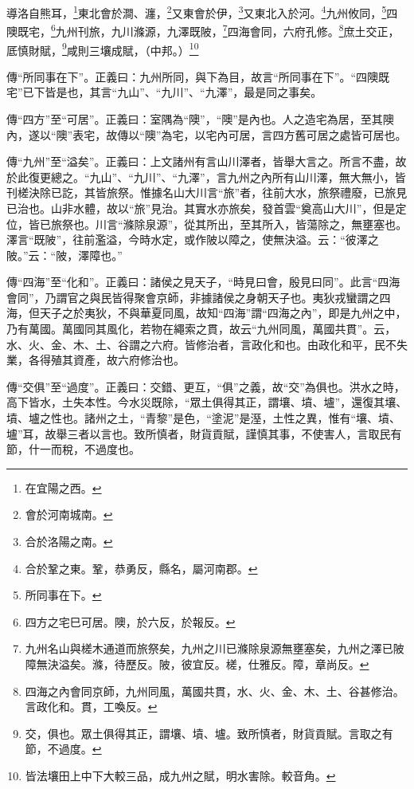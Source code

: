 導洛自熊耳，\footnote{在宜陽之西。}東北會於澗、瀍，\footnote{會於河南城南。}又東會於伊，\footnote{合於洛陽之南。}又東北入於河。\footnote{合於鞏之東。鞏，恭勇反，縣名，屬河南郡。}九州攸同，\footnote{所同事在下。}四隩既宅，\footnote{四方之宅巳可居。隩，於六反，於報反。}九州刊旅，九川滌源，九澤既陂，\footnote{九州名山與槎木通道而旅祭矣，九州之川已滌除泉源無壅塞矣，九州之澤已陂障無決溢矣。滌，待歷反。陂，彼宜反。槎，仕雅反。障，章尚反。}四海會同，六府孔修。\footnote{四海之內會同京師，九州同風，萬國共貫，水、火、金、木、土、谷甚修治。言政化和。貫，工喚反。}庶土交正，厎慎財賦，\footnote{交，俱也。眾土俱得其正，謂壤、墳、壚。致所慎者，財貨貢賦。言取之有節，不過度。}咸則三壤成賦，（中邦。）\footnote{皆法壤田上中下大較三品，成九州之賦，明水害除。較音角。}

{\noindent\zhuan{}\fzbyks 傳“所同事在下”。正義曰：九州所同，與下為目，故言“所同事在下”。“四隩既宅”已下皆是也，其言“九山”、“九川”、“九澤”，最是同之事矣。 \par}

{\noindent\zhuan{}\fzbyks 傳“四方”至“可居”。正義曰：室隅為“隩”，“隩”是內也。人之造宅為居，至其隩內，遂以“隩”表宅，故傳以“隩”為宅，以宅內可居，言四方舊可居之處皆可居也。 \par}

{\noindent\zhuan{}\fzbyks 傳“九州”至“溢矣”。正義曰：上文諸州有言山川澤者，皆舉大言之。所言不盡，故於此復更總之。“九山”、“九川”、“九澤”，言九州之內所有山川澤，無大無小，皆刊槎決除已訖，其皆旅祭。惟據名山大川言“旅”者，往前大水，旅祭禮廢，已旅見已治也。山非水體，故以“旅”見治。其實水亦旅矣，發首雲“奠高山大川”，但是定位，皆已旅祭也。川言“滌除泉源”，從其所出，至其所入，皆蕩除之，無壅塞也。澤言“既陂”，往前濫溢，今時水定，或作陂以障之，使無決溢。云：“彼澤之陂。”云：“陂，澤障也。” \par}

{\noindent\zhuan{}\fzbyks 傳“四海”至“化和”。正義曰：諸侯之見天子，“時見曰會，殷見曰同”。此言“四海會同”，乃謂官之與民皆得聚會京師，非據諸侯之身朝天子也。夷狄戎蠻謂之四海，但天子之於夷狄，不與華夏同風，故知“四海”謂“四海之內”，即是九州之中，乃有萬國。萬國同其風化，若物在繩索之貫，故云“九州同風，萬國共貫”。云，水、火、金、木、土、谷謂之六府。皆修治者，言政化和也。由政化和平，民不失業，各得殖其資產，故六府修治也。 \par}

{\noindent\zhuan{}\fzbyks 傳“交俱”至“過度”。正義曰：交錯、更互，“俱”之義，故“交”為俱也。洪水之時，高下皆水，土失本性。今水災既除，“眾土俱得其正，謂壤、墳、壚”，還復其壤、墳、壚之性也。諸州之土，“青黎”是色，“塗泥”是溼，土性之異，惟有“壤、墳、壚”耳，故舉三者以言也。致所慎者，財貨貢賦，謹慎其事，不使害人，言取民有節，什一而稅，不過度也。 \par}

